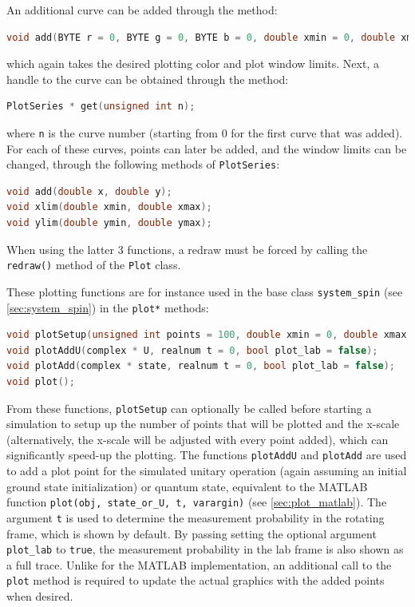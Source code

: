 \documentclass[10pt,a4paper,onecolumn,notitlepage]{article}
\begin{document}
An additional curve can be added through the method:
\begin{lstlisting}[language=C++]
void add(BYTE r = 0, BYTE g = 0, BYTE b = 0, double xmin = 0, double xmax = 0, double ymin = 0, double ymax = 1);
\end{lstlisting}
which again takes the desired plotting color and plot window limits. Next, a handle to the curve can be obtained through the method:
\begin{lstlisting}[language=C++]
PlotSeries * get(unsigned int n);
\end{lstlisting}
where \lstinline{n} is the curve number (starting from 0 for the first curve that was added). For each of these curves, points can later be added, and the window limits can be changed, through the following methods of \lstinline{PlotSeries}:
\begin{lstlisting}[language=C++]
void add(double x, double y);
void xlim(double xmin, double xmax);
void ylim(double ymin, double ymax);
\end{lstlisting}
When using the latter 3 functions, a redraw must be forced by calling the \lstinline{redraw()} method of the \lstinline{Plot} class.

These plotting functions are for instance used in the base class \lstinline{system_spin} (see \cref{sec:system_spin}) in the \lstinline{plot*} methods:
\begin{lstlisting}[language=C++]
void plotSetup(unsigned int points = 100, double xmin = 0, double xmax = 0);
void plotAddU(complex * U, realnum t = 0, bool plot_lab = false);
void plotAdd(complex * state, realnum t = 0, bool plot_lab = false);
void plot();
\end{lstlisting}
From these functions, \lstinline{plotSetup} can optionally be called before starting a simulation to setup up the number of points that will be plotted and the x-scale (alternatively, the x-scale will be adjusted with every point added), which can significantly speed-up the plotting.
The functions \lstinline{plotAddU} and \lstinline{plotAdd} are used to add a plot point for the simulated unitary operation (again assuming an initial ground state initialization) or quantum state, equivalent to the MATLAB function \lstinline{plot(obj, state_or_U, t, varargin)} (see \cref{sec:plot_matlab}). The argument \lstinline{t} is used to determine the measurement probability in the rotating frame, which is shown by default. By passing setting the optional argument \lstinline{plot_lab} to \lstinline{true}, the measurement probability in the lab frame is also shown as a full trace. Unlike for the MATLAB implementation, an additional call to the \lstinline{plot} method is required to update the actual graphics with the added points when desired.
\end{document}
